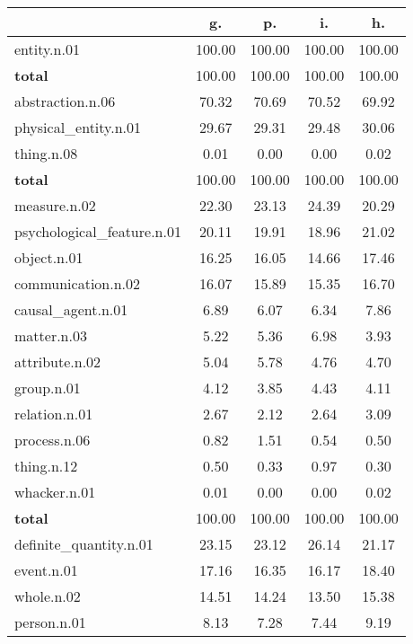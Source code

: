 \begin{table}[h!]
\begin{center}
\begin{tabular}{| l || c | c | c | c |}\hline
 & {\bf g.} & {\bf p.} & {\bf i.} & {\bf h.} \\\hline\hline
entity.n.01 & 100.00  & 100.00  & 100.00  & 100.00 \\\hline\hline
{{\bf total}} & 100.00  & 100.00  & 100.00  & 100.00 \\\hline\hline\hline
abstraction.n.06 & 70.32  & 70.69  & 70.52  & 69.92 \\\hline
physical\_entity.n.01 & 29.67  & 29.31  & 29.48  & 30.06 \\\hline
thing.n.08 & 0.01  & 0.00  & 0.00  & 0.02 \\\hline\hline
{{\bf total}} & 100.00  & 100.00  & 100.00  & 100.00 \\\hline\hline\hline
measure.n.02 & 22.30  & 23.13  & 24.39  & 20.29 \\\hline
psychological\_feature.n.01 & 20.11  & 19.91  & 18.96  & 21.02 \\\hline
object.n.01 & 16.25  & 16.05  & 14.66  & 17.46 \\\hline
communication.n.02 & 16.07  & 15.89  & 15.35  & 16.70 \\\hline
causal\_agent.n.01 & 6.89  & 6.07  & 6.34  & 7.86 \\\hline
matter.n.03 & 5.22  & 5.36  & 6.98  & 3.93 \\\hline
attribute.n.02 & 5.04  & 5.78  & 4.76  & 4.70 \\\hline
group.n.01 & 4.12  & 3.85  & 4.43  & 4.11 \\\hline
relation.n.01 & 2.67  & 2.12  & 2.64  & 3.09 \\\hline
process.n.06 & 0.82  & 1.51  & 0.54  & 0.50 \\\hline
thing.n.12 & 0.50  & 0.33  & 0.97  & 0.30 \\\hline
whacker.n.01 & 0.01  & 0.00  & 0.00  & 0.02 \\\hline\hline
{{\bf total}} & 100.00  & 100.00  & 100.00  & 100.00 \\\hline\hline\hline
definite\_quantity.n.01 & 23.15  & 23.12  & 26.14  & 21.17 \\\hline
event.n.01 & 17.16  & 16.35  & 16.17  & 18.40 \\\hline
whole.n.02 & 14.51  & 14.24  & 13.50  & 15.38 \\\hline
person.n.01 & 8.13  & 7.28  & 7.44  & 9.19 \\\hline

\end{tabular}
\end{center}
\end{table}
